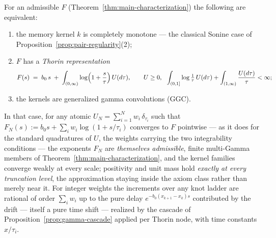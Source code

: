 \begin{proposition}\label{prop:thorin-subclass}
For an admissible $F$ (Theorem~\ref{thm:main-characterization}) the following are equivalent:
\begin{enumerate}
\item the memory kernel $k$ is completely monotone --- the classical Sonine case of
Proposition~\ref{prop:pair-regularity}(2);
\item $F$ has a \emph{Thorin representation}
\[
  F(s) \;=\; b_0\,s \;+\; \int_{(0,\infty)} \log\Bigl(1 + \frac{s}{\tau}\Bigr)\,U(d\tau),
  \qquad U \ge 0,\ \
  \int_{(0,1]} \log\tfrac{1}{\tau}\,U(d\tau) + \int_{(1,\infty)} \frac{U(d\tau)}{\tau} < \infty;
\]
\item the kernels are generalized gamma convolutions (GGC).
\end{enumerate}
In that case, for any atomic $U_N = \sum_{i=1}^N w_i\,\delta_{\tau_i}$ such that
$F_N(s) := b_0 s + \sum_i w_i \log(1 + s/\tau_i)$ converges to $F$ pointwise --- as it does
for the standard quadratures of $U$, the weights carrying the two integrability conditions
--- the exponents $F_N$ are \emph{themselves admissible}, finite multi-Gamma members of
Theorem~\ref{thm:main-characterization}, and the kernel families converge weakly at every
scale; positivity and unit mass hold \emph{exactly at every truncation level}, the
approximation staying inside the axiom class rather than merely near it. For integer weights
the increments over any knot ladder are rational of order $\sum_i w_i$ up to the pure delay
$e^{-b_0(x_{k+1}-x_k)s}$ contributed by the drift --- itself a pure time shift --- realized
by the cascade of Proposition~\ref{prop:gamma-cascade} applied per
Thorin node, with time constants $x/\tau_i$.
\end{proposition}
